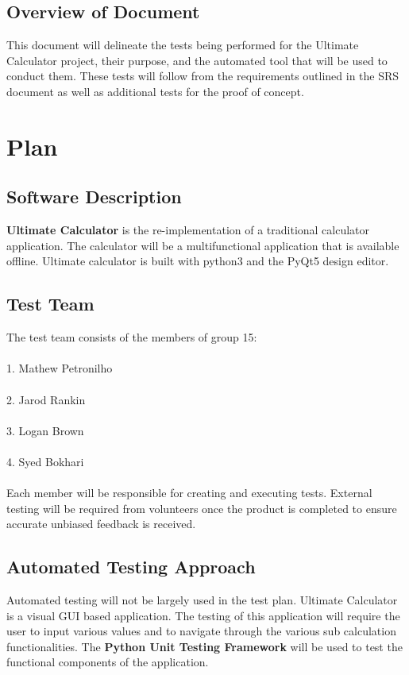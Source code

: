 \documentclass[12pt, titlepage]{article}
\begin{document}
\subsection{Overview of Document}

This document will delineate the tests being performed for the Ultimate Calculator project, their purpose, and the automated tool that will be used to conduct them. These tests will follow from the requirements outlined in the SRS document as well as additional tests for the proof of concept.

\section{Plan}
	
\subsection{Software Description}
\textbf{Ultimate Calculator} is the re-implementation of a traditional calculator application. The calculator will be a multifunctional application that is available offline. Ultimate calculator is built with python3 and the PyQt5 design editor.

\subsection{Test Team}
The test team consists of the members of group 15:
\\\\1. Mathew Petronilho
\\\\2. Jarod Rankin
\\\\3. Logan Brown
\\\\4. Syed Bokhari
\\\\Each member will be responsible for creating and executing tests. External testing will be required from volunteers once the product is completed to ensure accurate unbiased feedback is received. 

\subsection{Automated Testing Approach}
Automated testing will not be largely used in the test plan. Ultimate Calculator is a visual GUI based application. The testing of this application will require the user to input various values and to navigate through the various sub calculation functionalities. The \textbf{Python Unit Testing Framework} will be used to test the functional components of the application. 
\end{document}
